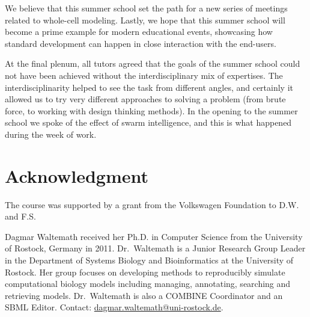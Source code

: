 \documentclass[journal,transmag]{IEEEtran}
\begin{document}
We believe that this summer school set the path for a new series of meetings related to whole-cell modeling.
Lastly, we hope that this summer school will become a prime example for modern educational events, showcasing how standard development can happen in close interaction with the end-users.

At the final plenum, all tutors agreed that the goals of the summer school could not have been achieved without the interdisciplinary mix of expertises. 
The interdisciplinarity helped to see the task from different angles, and certainly it allowed us to try very different approaches to solving a problem (from brute force, to working with design thinking methods). 
In the opening to the summer school we spoke of the effect of swarm intelligence, and this is what happened during the week of work.

\section*{Acknowledgment}
The course was supported by a grant from the Volkswagen Foundation to D.W. and F.S. 

\ifCLASSOPTIONcaptionsoff
  \newpage
\fi




% 

\begin{IEEEbiography}{Dagmar Waltemath}
received her Ph.D. in Computer Science from the University of Rostock, Germany in 2011. 
Dr.~Waltemath is a Junior Research Group Leader in the Department of Systems Biology and Bioinformatics at the University of Rostock. 
Her group focuses on developing methods to reproducibly simulate computational biology models including managing, annotating, searching and retrieving models.
Dr.~Waltemath is also a COMBINE Coordinator and an SBML Editor. 
Contact: \href{mailto:dagmar.waltemath@uni-rostock.de}{dagmar.waltemath@uni-rostock.de}.
\end{IEEEbiography}
\end{document}
